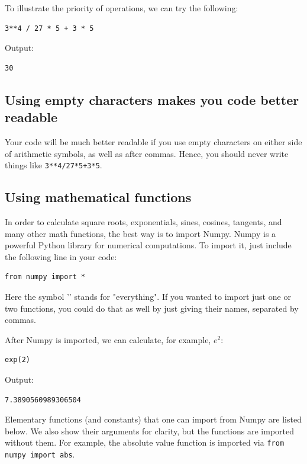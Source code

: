 To illustrate the priority of operations, we can try the following:

\begin{verbatim}
3**4 / 27 * 5 + 3 * 5
\end{verbatim}
Output:

\begin{verbatim}
30
\end{verbatim}
\subsection{Using empty characters makes you code better readable}
Your code will be much better readable if you use empty
characters on either side of arithmetic symbols, as well as 
after commas. Hence, you should never write things like {\tt 3**4/27*5+3*5}.

\subsection{Using mathematical functions}

In order to calculate square roots, exponentials, sines, cosines, tangents, and many other 
math functions, the best way is to import Numpy. Numpy is a powerful Python library 
for numerical computations. To import it, just include the following 
line in your code:

\begin{verbatim}
from numpy import *
\end{verbatim}
Here the symbol '{\tt *}' stands for "everything". If you wanted to import just one or two 
functions, you could do that as well by just giving their names, separated by commas. 

After Numpy is imported, we can calculate, for example, $e^2$:

\begin{verbatim}
exp(2)
\end{verbatim}
Output:
\begin{verbatim}
7.3890560989306504
\end{verbatim}
Elementary functions (and constants) that one can import from Numpy are listed
below. We also show their arguments for clarity, but the functions are imported without 
them. For example, the absolute value function is imported via {\tt from numpy import abs}.\\

